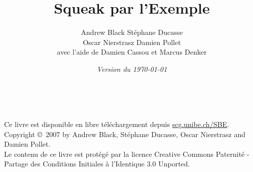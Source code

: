 \documentclass[a4paper,10pt,twoside]{book}
\begin{document}
\frontmatter
\setcounter{page}{1}
\pagestyle{headings}
\author{
	Andrew Black\quad
	St\'ephane Ducasse\\[1ex]
	Oscar Nierstrasz\quad
	Damien Pollet
	\\[4ex]
	avec l'aide de Damien Cassou et Marcus Denker}
\title{\Huge\bf Squeak par l'Exemple}
\isodate
\date{\emph{Version du \today}}
\maketitle
~ %
\vfill
\begin{footnotesize}
\setlength{\parindent}{0pt}
Ce livre est disponible en libre t\'el\'echargement depuis \url{scg.unibe.ch/SBE}.\\[1cm]

Copyright \copyright~2007 by Andrew Black, St\'ephane Ducasse, Oscar Nierstrasz and Damien Pollet.\\[1cm]

Le contenu de ce livre est prot\'eg\'e par la licence Creative Commons Paternit\'e - Partage des Conditions Initiales \`a l'Identique 3.0 Unported.


\end{footnotesize}
\end{document}
